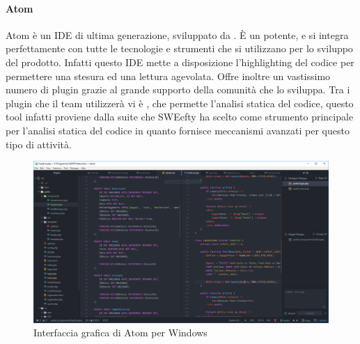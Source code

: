	
	\paragraph{Atom}
	\label{sec:Atom}
	\Spazio	
	Atom è un IDE di ultima generazione, sviluppato da . È un  potente,
	 e si integra perfettamente con tutte le tecnologie e strumenti che si utilizzano per lo sviluppo del prodotto. Infatti questo IDE mette a disposizione l'highlighting del codice per permettere una stesura ed una lettura agevolata. 
	Offre inoltre un vastissimo numero di plugin grazie al grande supporto della comunità  che lo sviluppa. Tra i plugin che il team utilizzerà vi è , che permette l'analisi statica del codice, questo tool infatti proviene dalla suite  che SWEefty ha scelto come strumento principale per l'analisi statica del codice in quanto fornisce meccanismi avanzati per questo tipo di attività.
	
	\begin{figure}[H]
		\label{Atom}
		\centering 
		\includegraphics[width=1\textwidth]{images/atom.png}
		\caption{Interfaccia grafica di Atom per Windows} %
	\end{figure}
	
			

